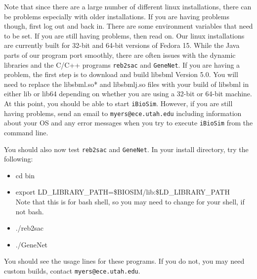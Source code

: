 \documentclass[titlepage,11pt]{article}
\begin{document}
Note that since there are a large number of different linux installations, there can be problems especially with older installations.  If you are having problems though, first log out and back in.  There are some environment variables that need to be set.  If you are still having problems, then read on.
Our linux installations are currently built for 32-bit and 64-bit versions of Fedora 15.  While the Java parts of our program port smoothly, there are often issues with the dynamic libraries and the C/C++ programs {\tt reb2sac} and {\tt GeneNet}.  If you are having a problem, the first step is to download and build libsbml Version 5.0.  You will need to replace the libsbml.so* and libsbmlj.so files with your build of libsbml in either lib or lib64 depending on whether you are using a 32-bit or 64-bit machine.  At this point, you should be able to start {\tt iBioSim}.  However, if you are still having problems, send an email to {\tt myers@ece.utah.edu} including information about your OS and any error messages when you try to execute {\tt iBioSim} from the command line.

You should also now test {\tt reb2sac} and {\tt GeneNet}.  In your install directory, try the following:
\begin{itemize}
\item cd bin
\item export LD\_LIBRARY\_PATH=\$BIOSIM/lib:\$LD\_LIBRARY\_PATH \\
Note that this is for bash shell, so you may need to change for your shell, if not bash.
\item ./reb2sac
\item ./GeneNet
\end{itemize}
You should see the usage lines for these programs.  If you do not, you may need custom builds, contact {\tt myers@ece.utah.edu}.
\end{document}
